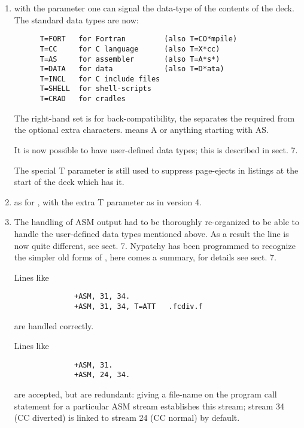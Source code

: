 \begin{enumerate}
\item
{}

with the  parameter one can signal the data-type of the contents of
the deck. The standard data types are now:
\begin{verbatim}
      T=FORT   for Fortran         (also T=CO*mpile)
      T=CC     for C language      (also T=X*cc)
      T=AS     for assembler       (also T=A*s*)
      T=DATA   for data            (also T=D*ata)
      T=INCL   for C include files
      T=SHELL  for shell-scripts
      T=CRAD   for cradles
\end{verbatim}
The right-hand set is for back-compatibility, the \Lit{*} separates
the required from the optional extra characters.
 means A or anything starting with AS.

It is now possible to have user-defined data types; this is described
in sect. 7.

The special T parameter  is still used to suppress page-ejects
in listings at the start of the deck which has it.


\item
{}

as for , with the extra T parameter  as in version 4.


\item
{}

The handling of ASM output had to be thoroughly re-organized to
be able to handle the user-defined data types mentioned above.
As a result the line  is now quite different, see sect. 7.
Nypatchy has been programmed to recognize the simpler old forms
of , here comes a summary, for details see sect. 7.

Lines like
\begin{verbatim}
              +ASM, 31, 34.
              +ASM, 31, 34, T=ATT   .fcdiv.f
\end{verbatim}
are handled correctly.

Lines like
\begin{verbatim}
              +ASM, 31.
              +ASM, 24, 34.
\end{verbatim}
are accepted, but are redundant: giving a file-name on the program
call statement for a particular ASM stream establishes this stream;
stream 34 (CC diverted) is linked to stream 24 (CC normal) by default.


\end{enumerate}
